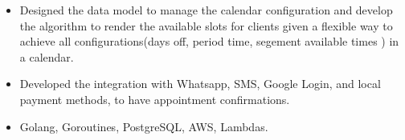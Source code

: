 \documentclass[letterpaper]{twentysecondcv} %
\begin{document}
\begin{twenty}
{        \begin{itemize}
            \item
	    Designed the data model to manage the calendar configuration and develop the algorithm to render the available slots for clients given a flexible way
	    to achieve all configurations(days off, period time, segement available times ) in a calendar. 
         \end{itemize}
         
        \begin{itemize}
            \item
            Developed the integration with Whatsapp, SMS, Google Login, and local payment methods, to have appointment confirmations.
        \end{itemize}
         
         \begin{itemize}
            \item
            Golang, Goroutines, PostgreSQL, AWS, Lambdas.
         \end{itemize}
         
    }
    \\
    
\end{twenty}
\end{document}
